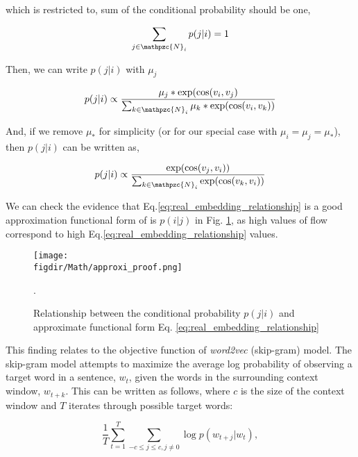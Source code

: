 \documentclass[12pt]{article} %
\def\figdir{../Figs}
\begin{document}
which is restricted to, sum of the conditional probability should be one,

\begin{equation}
    \label{eq:sum of the conditional probabiitliy}
    \sum_{j\in\mathpzc{N}_i} p(j|i) = 1
\end{equation}

Then, we can write $p(j|i)$ with $\mu_{j}$

\begin{equation}
    p(j|i) \propto \frac{{\mu_j}* \exp(\cos(v_i,v_j)}{\sum_{k\in\mathpzc{N}_i} {\mu_k}* \exp(\cos(v_i,v_k))}
\end{equation}

And, if we remove ${\mu_*}$ for simplicity (or for our special case with $\mu_{i} = \mu_{j} = \mu_*$), then $p(j|i)$ can be written as,

\begin{equation}
    \label{eq:real_embedding_relationship}
    p(j|i) \propto \frac{\exp(\cos(v_j, v_i))}{\sum_{k\in\mathpzc{N}_i} \exp(\cos(v_k,v_i))}
\end{equation}

We can check the evidence that Eq.\ref{eq:real_embedding_relationship} is a good approximation functional form of is $p(i|j)$ in Fig. \ref{fig:real_embedding_relationship}, as high values of flow correspond to high Eq.\ref{eq:real_embedding_relationship} values.

%
%
\begin{figure}
    \centering
    \texttt{[image: \\figdir/Math/approxi\_proof.png]}
    \caption{Relationship between the conditional probability $p(j|i)$ and approximate functional form Eq. \ref{eq:real_embedding_relationship}}.
    \label{fig:real_embedding_relationship}
\end{figure}

This finding relates to the objective function of \textit{word2vec} (skip-gram) model. The skip-gram model attempts to maximize the average log probability of observing a target word in a sentence, $w_{t}$, given the words in the surrounding context window, $w_{t + k}$. This can be written as follows, where $c$ is the size of the context window and $T$ iterates through possible target words:

\begin{equation}
    \label{eq:skipgram_log_prob_condensed}
    \frac{1}{T}\sum_{t=1}^{T} \sum_{-c \le j \le c, j \neq 0} \log p(w_{t+j}|w_t),  
\end{equation}
\end{document}
